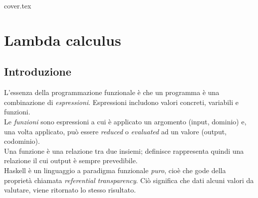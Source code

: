 \documentclass[a4paper, 12pt]{book}
\begin{document}
{cover.tex}
\tableofcontents

\chapter{Lambda calculus}
    \section{Introduzione}
    L'essenza della programmazione funzionale è che un programma è una combinazione di \textit{espressioni}. Espressioni includono valori concreti, variabili e funzioni.\\
    Le \textit{funzioni} sono espressioni a cui è applicato un argomento (input, dominio) e, una volta applicato, può essere \textit{reduced} o \textit{evaluated} ad un valore (output, codominio).\\
    Una funzione è una relazione tra due insiemi; definisce rappresenta quindi una relazione il cui output è sempre prevedibile.\\
    Haskell è un linguaggio a paradigma funzionale \textit{puro}, cioè che gode della proprietà chiamata \textit{referential transparency}. Ciò significa che dati alcuni valori da valutare, viene ritornato lo stesso risultato.\\
\end{document}
